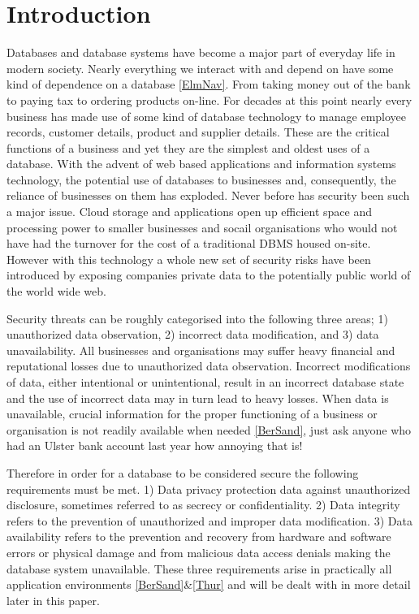 \section{Introduction}

Databases and database systems have become a major part of everyday life in modern society.  Nearly everything we interact with and depend on have some kind of dependence on a database \ref{ElmNav}.  From taking money out of the bank to paying tax to ordering products on-line.  For decades at this point nearly every business has made use of some kind of database technology to manage employee records, customer details, product and supplier details.  These are the critical functions of a business and yet they are the simplest and oldest uses of a database.  With the advent of web based applications and information systems technology, the potential use of databases to businesses and, consequently, the reliance of businesses on them has exploded.  Never before has security been such a major issue.  Cloud storage and applications open up efficient space and processing power to smaller businesses and socail organisations who would not have had the turnover for the cost of a traditional DBMS housed on-site.  However with this technology a whole new set of security risks have been introduced by exposing companies private data to the potentially public world of the world wide web.  

Security threats can be roughly categorised into the following three areas; 1) unauthorized data observation, 2) incorrect data modification, and 3) data unavailability.  All businesses and organisations may suffer heavy financial and reputational losses due to unauthorized data observation. Incorrect modifications of data, either intentional or unintentional, result in an incorrect database state and the use of incorrect data may in turn lead to heavy losses.  When data is unavailable, crucial information for the proper functioning of a business or organisation is not readily available when needed \ref{BerSand}, just ask anyone who had an Ulster bank account last year how annoying that is!  

Therefore in order for a database to be considered secure the following requirements must be met.  1) Data privacy protection data against unauthorized disclosure, sometimes referred to as secrecy or confidentiality.  2) Data integrity refers to the prevention of unauthorized and improper data modification.  3) Data availability refers to the prevention and recovery from hardware and software errors or physical damage and from malicious data access denials making the database system unavailable. These three requirements arise in practically all application environments \ref{BerSand}&\ref{Thur} and will be dealt with in more detail later in this paper.


